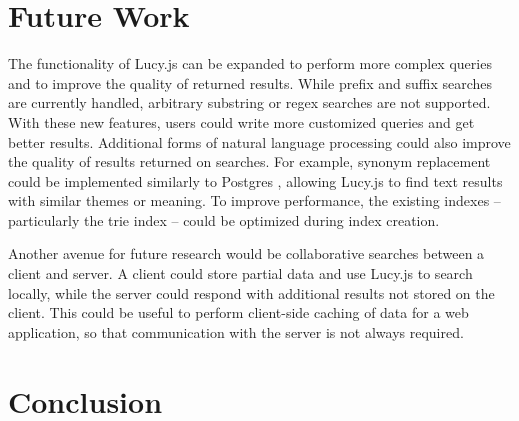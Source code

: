 \documentclass{vldb}
\begin{document}
\section{Future Work}
The functionality of Lucy.js can be expanded to perform more complex queries and to improve the quality of returned results. While prefix and suffix searches are currently handled, arbitrary substring or regex searches are not supported. With these new features, users could write more customized queries and get better results. Additional forms of natural language processing could also improve the quality of results returned on searches. For example, synonym replacement could be implemented similarly to Postgres , allowing Lucy.js to find text results with similar themes or meaning. To improve performance, the existing indexes -- particularly the trie index -- could be optimized during index creation.

Another avenue for future research would be collaborative searches between a client and server. A client could store partial data and use Lucy.js to search locally, while the server could respond with additional results not stored on the client. This could be useful to perform client-side caching of data for a web application, so that communication with the server is not always required.

\section{Conclusion}



\end{document}
